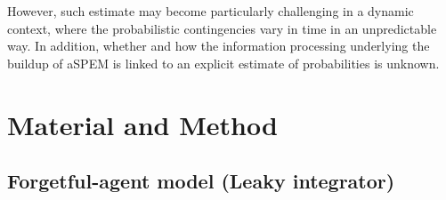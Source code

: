 \documentclass[profile,final,english, draft]{article}%
\begin{document}
However, such estimate may become particularly challenging in a dynamic context, where the probabilistic contingencies vary in time in an unpredictable way. In addition, whether and how the information processing underlying the buildup of aSPEM is linked to an explicit estimate of probabilities is unknown.


\section{Material and Method}

\subsection{Forgetful-agent model (Leaky integrator)}
%
%
%
%
\end{document}
